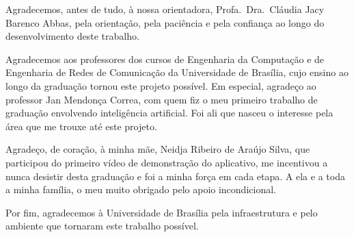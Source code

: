 Agradecemos, antes de tudo, à nossa orientadora, Profa.\ Dra.\ Cláudia Jacy Barenco Abbas,
pela orientação, pela paciência e pela confiança ao longo do desenvolvimento deste trabalho.

Agradecemos aos professores dos cursos de Engenharia da Computação e de Engenharia de Redes de
Comunicação da Universidade de Brasília, cujo ensino ao longo da graduação tornou este projeto
possível. Em especial, agradeço ao professor Jan Mendonça Correa, com quem fiz o meu primeiro
trabalho de graduação envolvendo inteligência artificial. Foi ali que nasceu o interesse pela
área que me trouxe até este projeto.

Agradeço, de coração, à minha mãe, Neidja Ribeiro de Araújo Silva, que participou do primeiro
vídeo de demonstração do aplicativo, me incentivou a nunca desistir desta graduação e foi a
minha força em cada etapa. A ela e a toda a minha família, o meu muito obrigado pelo apoio
incondicional.


Por fim, agradecemos à Universidade de Brasília pela infraestrutura e pelo ambiente que
tornaram este trabalho possível.\\
